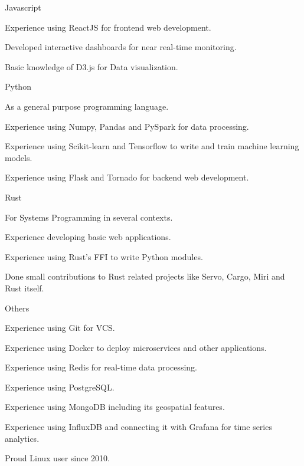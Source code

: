 \begin{cvskills}

\cvskill
{Javascript} %
{
  \begin{cvitems}
  \item {Experience using ReactJS for frontend web development.}
  \item {Developed interactive dashboards for near real-time monitoring.}
  \item {Basic knowledge of D3.js for Data visualization.}
  \end{cvitems}
}


\cvskill
{Python} %
{
  \begin{cvitems}
  \item {As a general purpose programming language.}
  \item {Experience using Numpy, Pandas and PySpark for data processing.}
  \item {Experience using Scikit-learn and Tensorflow to write and train machine learning models.}
  \item {Experience using Flask and Tornado for backend web development.}
  \end{cvitems}
}


\cvskill
{Rust} %
{
  \begin{cvitems}
  \item {For Systems Programming in several contexts.}
  \item {Experience developing basic web applications.}
  \item {Experience using Rust's FFI to write Python modules.}
  \item {Done small contributions to Rust related projects like Servo, Cargo, Miri and Rust itself.}
  \end{cvitems}
}


\cvskill
{Others} %
{
  \begin{cvitems}
  \item {Experience using Git for VCS.}
  \item {Experience using Docker to deploy microservices and other applications.}
  \item {Experience using Redis for real-time data processing.}
  \item {Experience using PostgreSQL.}
  \item {Experience using MongoDB including its geospatial features.}
  \item {Experience using InfluxDB and connecting it with Grafana for time series analytics.}
  \item {Proud Linux user since 2010.}
  \end{cvitems}
}


\end{cvskills}
